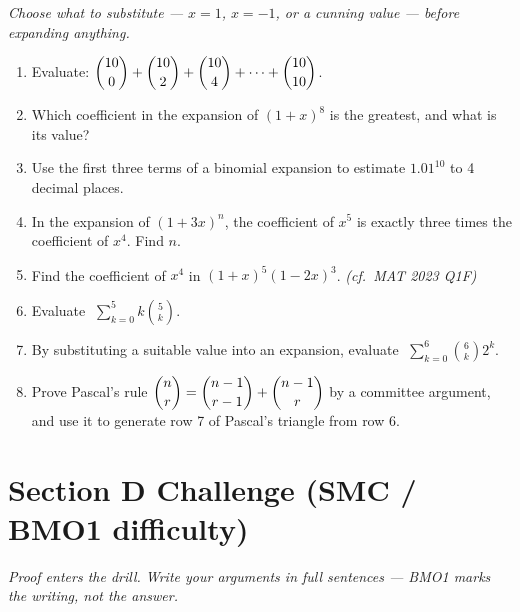 \documentclass[11pt,a4paper]{article}
\begin{document}
\noindent\textit{Choose what to substitute --- $x=1$, $x=-1$, or a cunning value --- before expanding anything.}

\begin{enumerate}

\item Evaluate: $\dbinom{10}{0}+\dbinom{10}{2}+\dbinom{10}{4}+\cdots+\dbinom{10}{10}$.

\item Which coefficient in the expansion of $(1+x)^8$ is the greatest, and what is its value?

\item Use the first three terms of a binomial expansion to estimate $1.01^{10}$ to 4 decimal places.

\item In the expansion of $(1+3x)^n$, the coefficient of $x^5$ is exactly three times the coefficient of $x^4$. Find $n$.

\item Find the coefficient of $x^4$ in $(1+x)^5(1-2x)^3$. \textit{\small(cf.\ MAT 2023 Q1F)}

\item Evaluate $\;\displaystyle\sum_{k=0}^{5}k\binom{5}{k}$.

\item By substituting a suitable value into an expansion, evaluate $\;\displaystyle\sum_{k=0}^{6}\binom{6}{k}2^k$.

\item Prove Pascal's rule $\dbinom{n}{r}=\dbinom{n-1}{r-1}+\dbinom{n-1}{r}$ by a committee argument, and use it to generate row 7 of Pascal's triangle from row 6.

\end{enumerate}

\section*{Section D \quad Challenge \hfill{\normalfont\small(SMC / BMO1 difficulty)}}

\noindent\textit{Proof enters the drill. Write your arguments in full sentences --- BMO1 marks the writing, not the answer.}
\end{document}
